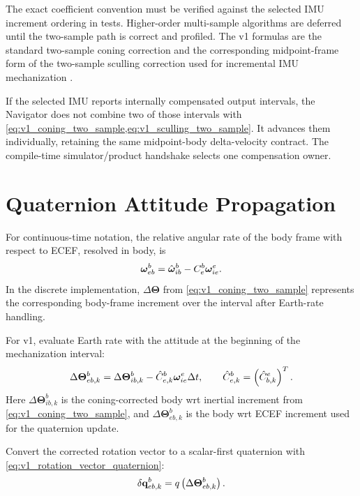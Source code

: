 The exact coefficient convention must be verified against the selected IMU
increment ordering in tests. Higher-order multi-sample algorithms are deferred
until the two-sample path is correct and profiled. The v1 formulas are the
standard two-sample coning correction and the corresponding midpoint-frame
form of the two-sample sculling correction used for incremental IMU
mechanization \cite{groves2013,titterton2004}.

If the selected IMU reports internally compensated output intervals, the
Navigator does not combine two of those intervals with
\cref{eq:v1_coning_two_sample,eq:v1_sculling_two_sample}. It advances them
individually, retaining the same midpoint-body delta-velocity contract. The
compile-time simulator/product handshake selects one compensation owner.

\section{Quaternion Attitude Propagation}

For continuous-time notation, the relative angular rate of the body frame with
respect to ECEF, resolved in body, is
\begin{equation}
\boldsymbol{\omega}_{eb}^{b}
=
\hat{\boldsymbol{\omega}}_{ib}^{b}
-
C_e^b\boldsymbol{\omega}_{ie}^{e}.
\end{equation}
In the discrete implementation, $\Delta\boldsymbol\Theta$ from
\cref{eq:v1_coning_two_sample} represents the corresponding body-frame
increment over the interval after Earth-rate handling.

For v1, evaluate Earth rate with the attitude at the beginning of the
mechanization interval:
\begin{equation}
\Delta\boldsymbol\Theta_{eb,k}^{b}
=
\Delta\boldsymbol\Theta_{ib,k}^{b}
-
\hat{C}_{e,k}^{b}\boldsymbol{\omega}_{ie}^{e}\Delta t,
\qquad
\hat{C}_{e,k}^{b}=\left(\hat{C}_{b,k}^{e}\right)^T.
\label{eq:v1_discrete_earth_rate_attitude_increment}
\end{equation}
Here $\Delta\boldsymbol\Theta_{ib,k}^{b}$ is the coning-corrected body wrt
inertial increment from \cref{eq:v1_coning_two_sample}, and
$\Delta\boldsymbol\Theta_{eb,k}^{b}$ is the body wrt ECEF increment used for
the quaternion update.

Convert the corrected rotation vector to a scalar-first quaternion with
\cref{eq:v1_rotation_vector_quaternion}:
\begin{equation}
\delta\mathbf{q}_{eb,k}^{b}
=
q\left(\Delta\boldsymbol\Theta_{eb,k}^{b}\right).
\label{eq:v1_discrete_attitude_delta_quat}
\end{equation}

